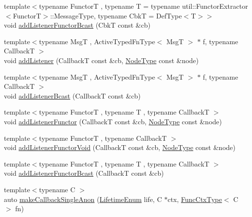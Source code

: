 \begin{DoxyCompactItemize}
\item 
{\footnotesize template$<$typename FunctorT , typename T  = typename util\+::\+Functor\+Extractor$<$\+Functor\+T$>$\+::\+Message\+Type, typename CbkT  = Def\+Type$<$\+T$>$$>$ }\\void \hyperlink{structvt_1_1pipe_1_1_pipe_manager_t_l_a3bbcc3d70bb6840ede74747011f18ea8}{add\+Listener\+Functor\+Bcast} (CbkT const \&cb)
\item 
{\footnotesize template$<$typename MsgT , Active\+Typed\+Fn\+Type$<$ Msg\+T $>$ $\ast$ f, typename CallbackT $>$ }\\void \hyperlink{structvt_1_1pipe_1_1_pipe_manager_t_l_ae1aee468ba813cc359e3d3602722b161}{add\+Listener} (CallbackT const \&cb, \hyperlink{namespacevt_a866da9d0efc19c0a1ce79e9e492f47e2}{Node\+Type} const \&node)
\item 
{\footnotesize template$<$typename MsgT , Active\+Typed\+Fn\+Type$<$ Msg\+T $>$ $\ast$ f, typename CallbackT $>$ }\\void \hyperlink{structvt_1_1pipe_1_1_pipe_manager_t_l_af50d2867536e0b9db56560126c3da066}{add\+Listener\+Bcast} (CallbackT const \&cb)
\item 
{\footnotesize template$<$typename FunctorT , typename T , typename CallbackT $>$ }\\void \hyperlink{structvt_1_1pipe_1_1_pipe_manager_t_l_aca69c630748b177c01af61b39ffad0ec}{add\+Listener\+Functor} (CallbackT const \&cb, \hyperlink{namespacevt_a866da9d0efc19c0a1ce79e9e492f47e2}{Node\+Type} const \&node)
\item 
{\footnotesize template$<$typename FunctorT , typename CallbackT $>$ }\\void \hyperlink{structvt_1_1pipe_1_1_pipe_manager_t_l_a12039964ec1deb173f0ee83ad4c8a543}{add\+Listener\+Functor\+Void} (CallbackT const \&cb, \hyperlink{namespacevt_a866da9d0efc19c0a1ce79e9e492f47e2}{Node\+Type} const \&node)
\item 
{\footnotesize template$<$typename FunctorT , typename T , typename CallbackT $>$ }\\void \hyperlink{structvt_1_1pipe_1_1_pipe_manager_t_l_a7f59d9749248fb963a7c279a053fe220}{add\+Listener\+Functor\+Bcast} (CallbackT const \&cb)
\item 
{\footnotesize template$<$typename C $>$ }\\auto \hyperlink{structvt_1_1pipe_1_1_pipe_manager_t_l_a974ab3bbfc8a972f5d016ebf70c5a6d7}{make\+Callback\+Single\+Anon} (\hyperlink{namespacevt_1_1pipe_acb42b284378c0fdac1d7c6335dc26f58}{Lifetime\+Enum} life, C $\ast$ctx, \hyperlink{structvt_1_1pipe_1_1_pipe_manager_base_ad8463823b6b4cfdb67c119d6d22e3bac}{Func\+Ctx\+Type}$<$ C $>$ fn)

\end{DoxyCompactItemize}
